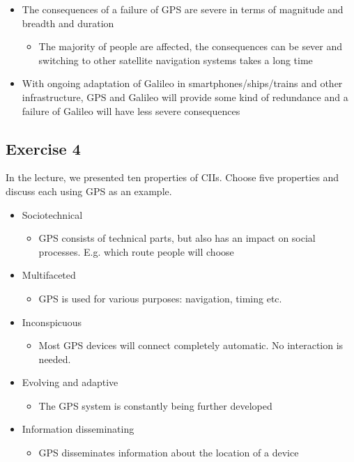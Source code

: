\documentclass{article}
\begin{document}
\begin{itemize}
\begin{itemize}
\begin{itemize}
                    \end{itemize}
          \end{itemize}
    \item The consequences of a failure of GPS are severe in terms of magnitude and breadth and duration
          \begin{itemize}
              \item The majority of people are affected, the consequences can be sever and switching to other satellite navigation systems takes a long time
          \end{itemize}
    \item With ongoing adaptation of Galileo in smartphones/ships/trains and other infrastructure, GPS and Galileo will provide some kind of redundance and a failure of Galileo will have less severe consequences
\end{itemize}
\subsection{Exercise 4}
In the lecture, we presented ten properties of CIIs. Choose five properties and discuss each using GPS as an example.
\begin{itemize}
    \item Sociotechnical
          \begin{itemize}
              \item GPS consists of technical parts, but also has an impact on social processes. E.g. which route people will choose
          \end{itemize}
    \item Multifaceted
          \begin{itemize}
              \item GPS is used for various purposes: navigation, timing etc.
          \end{itemize}
    \item Inconspicuous
          \begin{itemize}
              \item Most GPS devices will connect completely automatic. No interaction is needed.
          \end{itemize}
    \item Evolving and adaptive
          \begin{itemize}
              \item The GPS system is constantly being further developed
          \end{itemize}
    \item Information disseminating
          \begin{itemize}
              \item GPS disseminates information about the location of a device
          \end{itemize}
\end{itemize}
\end{document}
